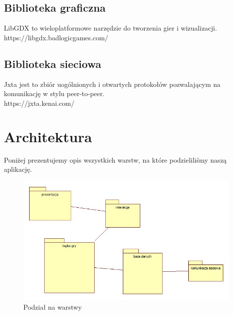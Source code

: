 \documentclass[a4paper, 11pt]{article}
\begin{document}
	\subsection{Biblioteka graficzna}
	LibGDX to wieloplatformowe narzędzie do tworzenia gier i wizualizacji.\\
	 https://libgdx.badlogicgames.com/
	\subsection{Biblioteka sieciowa}
	Jxta jest to zbiór uogólnionych i otwartych protokołów pozwalającym na komunikację w stylu peer-to-peer. \\
	https://jxta.kenai.com/
	\section{Architektura}
	\indent
	
	Poniżej prezentujemy opis wszystkich warstw, na które podzieliliśmy naszą aplikację.
	\begin{figure}[H]%
		\includegraphics[scale=0.5]{uml/main.jpg}\caption{Podział na warstwy}
	\end{figure}
\end{document}
